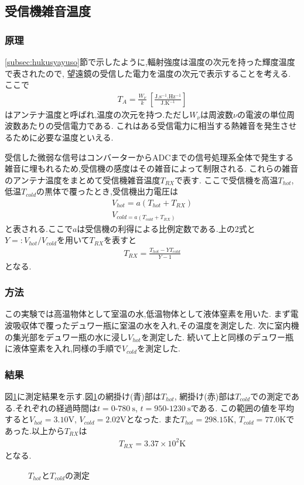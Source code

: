 \subsection{受信機雑音温度}
\subsubsection{原理}
\ref{subsec:hukusyayuso}節で示したように,輻射強度は温度の次元を持った輝度温度で表されたので,
望遠鏡の受信した電力を温度の次元で表示することを考える.
ここで
\begin{align}
  T_A=\frac{W_\nu}{k}\ \left[\frac{\si{\joule.\second^{-1}.\hertz^{-1}}}{\si{\joule.\kelvin^{-1}}}\right]
\end{align}
はアンテナ温度と呼ばれ,温度の次元を持つ.ただし$W_\nu$は周波数$\nu$の電波の単位周波数あたりの受信電力である.
これはある受信電力に相当する熱雑音を発生させるために必要な温度といえる.

受信した微弱な信号はコンバーターからADCまでの信号処理系全体で発生する雑音に埋もれるため,受信機の感度はその雑音によって制限される.
これらの雑音のアンテナ温度をまとめて受信機雑音温度$T_{RX}$で表す.
ここで受信機を高温$T_{hot}$,低温$T_{cold}$の黒体で覆ったとき,受信機出力電圧は
\begin{align}
  V_{hot}=a(T_{hot}+T_{RX})\\
  V_{cold=a(T_{cold}+T_{RX})}
\end{align}
と表される.ここで$a$は受信機の利得による比例定数である.上の2式と$Y=:V_{hot}/V_{cold}$を用いて$T_{RX}$を表すと
\begin{align}
  T_{RX}=\frac{T_{hot}-YT_{cold}}{Y-1}
\end{align}
となる.
\subsubsection{方法}
この実験では高温物体として室温の水,低温物体として液体窒素を用いた.
まず電波吸収体で覆ったデュワー瓶に室温の水を入れ,その温度を測定した.
次に室内機の集光部をデュワー瓶の水に浸し$V_{hot}$を測定した.
続いて上と同様のデュワー瓶に液体窒素を入れ,同様の手順で$V_{cold}$を測定した.
\subsubsection{結果}
図\ref{fig:Thot_Tcold}に測定結果を示す.図\ref{fig:Thot_Tcold}の網掛け(青)部は$T_{hot}$,
網掛け(赤)部は$T_{cold}$での測定である.それぞれの経過時間は$t=0$-$780\ \si{\second}$, $t=950$-$1230\ \si{\second}$である.
この範囲の値を平均すると$V_{hot}=3.10\si{\volt}$, $V_{cold}=2.02\si{\volt}$となった.
また$T_{hot}=298.15\si{\kelvin}$, $T_{cold}=77.0\si{\kelvin}$であった.以上から$T_{RX}$は
\begin{align}
  T_{RX}=3.37\times10^2\si{\kelvin}
\end{align}
となる.
\begin{figure}[hptb]
\begin{center}

\caption{$T_{hot}$と$T_{cold}$の測定}
\label{fig:Thot_Tcold}
\end{center}
\end{figure}